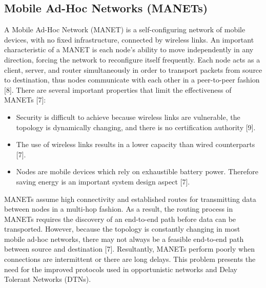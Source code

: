 \documentclass{article}
\begin{document}
\subsection{Mobile Ad-Hoc Networks (MANETs)}
A Mobile Ad-Hoc Network (MANET) is a self-configuring network of mobile devices, with no fixed infrastructure, connected by wireless links. An important characteristic of a MANET is each node's ability to move independently in any direction, forcing the network to reconfigure itself frequently. Each node acts as a client, server, and router simultaneously in order to transport packets from source to destination, thus nodes communicate with each other in a peer-to-peer fashion [8]. There are several important properties that limit the effectiveness of MANETs [7]:
\begin{itemize}
	\item Security is difficult to achieve because wireless links are vulnerable, the topology is dynamically changing, and there is no certification authority [9].
	\item The use of wireless links results in a lower capacity than wired counterparts [7].
	\item Nodes are mobile devices which rely on exhaustible battery power. Therefore saving energy is an important system design aspect [7].
\end{itemize}
MANETs assume high connectivity and established routes for transmitting data between nodes in a multi-hop fashion. As a result, the routing process in MANETs requires the discovery of an end-to-end path before data can be transported. However, because the topology is constantly changing in most mobile ad-hoc networks, there may not always be a feasible end-to-end path between source and destination [7]. Resultantly, MANETs perform poorly when connections are intermittent or there are long delays. This problem presents the need for the improved protocols used in opportunistic networks and Delay Tolerant Networks (DTNs).
\end{document}
